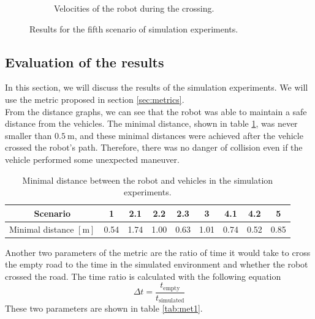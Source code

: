 \begin{figure}[H]
\begin{subfigure}{0.49\linewidth}
                    \caption{Velocities of the robot during the crossing.}
                    \label{fig:scene5_vel}
                \end{subfigure}
                \caption{Results for the fifth scenario of simulation experiments.}
                \label{fig:scene5_graphs}
            \end{figure}
    \subsection{Evaluation of the results}
        In this section, we will discuss the results of the simulation experiments. We will use the metric proposed in section \ref{sec:metrics}.\\
        From the distance graphs, we can see that the robot was able to maintain a safe distance from the vehicles. The minimal distance, shown in table \ref{tab:dist}, was never smaller than $0.5\:\si{\m}$, and these minimal distances were achieved after the vehicle crossed the robot's path. Therefore, there was no danger of collision even if the vehicle performed some unexpected maneuver.\\
        \begin{table}[H]
            \centering
            \begin{tabular}{|c||c|c|c|c|c|c|c|c|}
                \hline
                Scenario & 1 & 2.1 & 2.2 & 2.3 & 3 & 4.1 & 4.2 & 5 \\
                \hline
                Minimal distance $[\si{\m}]$ & 0.54 & 1.74 & 1.00 & 0.63 & 1.01 & 0.74 & 0.52 & 0.85 \\
                \hline
            \end{tabular}
            \caption{Minimal distance between the robot and vehicles in the simulation experiments.}
            \label{tab:dist}
        \end{table}
        Another two parameters of the metric are the ratio of time it would take to cross the empty road to the time in the simulated environment and whether the robot crossed the road. The time ratio is calculated with the following equation
        \begin{equation}
            \Delta t = \frac{t_{\text{empty}}}{t_{\text{simulated}}}
        \end{equation}
        \noindent These two parameters are shown in table \ref{tab:met1}.

